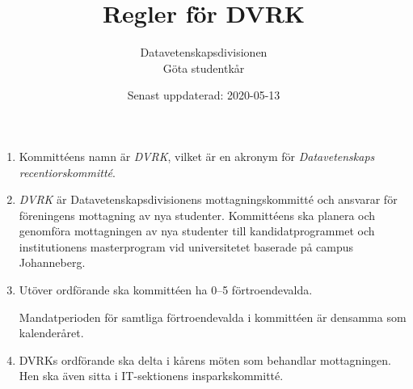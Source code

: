 \documentclass{dvd}
\begin{document}
	\title{Regler för DVRK}
	\author{Datavetenskapsdivisionen\\Göta studentkår}
	\date{Senast uppdaterad: 2020-05-13}

	\begin{enumerate}[label=\arabic* §, ref=\arabic*]
		\item Kommittéens namn är \emph{DVRK}, vilket är en akronym för \emph{Datavetenskaps recentiorskommitté}.
	
		\item \emph{DVRK} är Datavetenskapsdivisionens mottagningskommitté och ansvarar för föreningens mottagning av nya studenter.
		Kommittéens ska planera och genomföra mottagningen av nya studenter till kandidatprogrammet och institutionens masterprogram vid universitetet baserade på campus Johanneberg.

		\item Utöver ordförande ska kommittéen ha 0--5 förtroendevalda.

		Mandatperioden för samtliga förtroendevalda i kommittéen är densamma som kalenderåret.

		\item DVRKs ordförande ska delta i kårens möten som behandlar mottagningen.
		Hen ska även sitta i IT-sektionens insparkskommitté.
	\end{enumerate}
\end{document}
